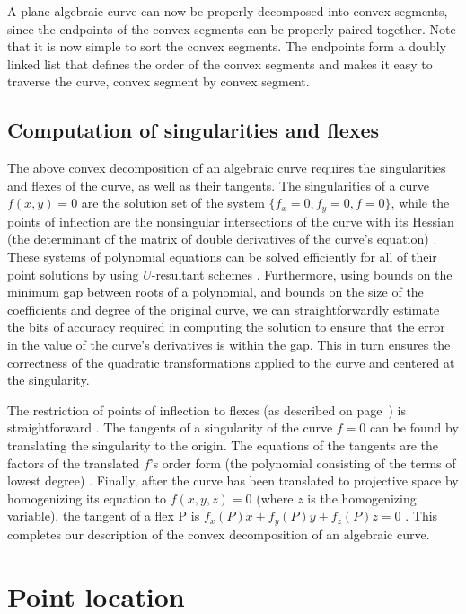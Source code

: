 A plane algebraic curve can now be properly decomposed into convex segments,
since the endpoints of the convex segments can be properly paired together.
Note that it is now simple to sort the convex segments.
The endpoints form a doubly linked list
that defines the order of the convex segments
and makes it easy to traverse the curve, convex segment by convex segment.

\subsection{Computation of singularities and flexes}
\label{ssc}

The above convex decomposition of an algebraic curve requires the singularities 
and flexes of the curve, as well as their tangents.
The singularities of a curve $f(x,y)=0$ are the solution set of the system
$\{f_{x}=0,f_{y}=0,f=0\}$, while the points of inflection are the nonsingular 
intersections of the curve with its Hessian (the determinant 
of the matrix of double derivatives of the curve's equation) \cite{walker}.
%
These systems of polynomial equations can be solved efficiently 
for all of their point solutions by using $U$-resultant schemes \cite{Ca}. 
Furthermore, using bounds on the minimum gap between roots of a polynomial, 
and bounds on the
size of the coefficients and degree of the original curve, we can straightforwardly
estimate the bits of accuracy required in computing the solution 
to ensure that the error in the value of the curve's derivatives is within the gap. 
This in turn ensures the correctness of the quadratic transformations applied to the 
curve and centered at the singularity.

The restriction of points of inflection to flexes (as described on 
page~\pageref{restriction})
is straightforward \cite[p. 44]{jj}.
The tangents of a singularity of the curve $f=0$ can be found by translating 
the singularity to the origin.
The equations of the tangents are the factors of the translated $f$'s order
form (the polynomial consisting of the terms of lowest degree) \cite{walker}.
Finally, after the curve has been translated to projective space by homogenizing 
its equation to $f(x,y,z)=0$ (where $z$ is the homogenizing variable),
the tangent of a flex P is $f_{x}(P)x + f_{y}(P)y + f_{z}(P)z= 0$ \cite{walker}.
This completes our description of the convex decomposition of an algebraic curve.

\section{Point location}
\label{s-loc}

